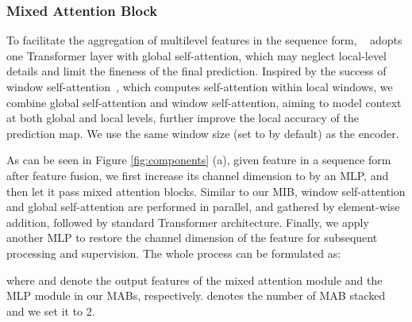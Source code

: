 \documentclass[lettersize,journal]{IEEEtran}
\begin{document}
\subsubsection{Mixed Attention Block}

To facilitate the aggregation of multilevel features in the sequence form, ~\cite{VST} adopts one Transformer layer with global self-attention, which may neglect local-level details and limit the fineness of the final prediction. Inspired by the success of window self-attention~\cite{Swin}, which computes self-attention within local windows, we combine global self-attention and window self-attention, aiming to model context at both global and local levels, further improve the local accuracy of the prediction map. We use the same window size (set to  by default) as the encoder. 

As can be seen in Figure \ref{fig:components} (a), given feature in a sequence form  after feature fusion, we first increase its channel dimension to  by an MLP, and then let it pass  mixed attention blocks. Similar to our MIB, window self-attention and global self-attention are performed in parallel, and gathered by element-wise addition, followed by standard Transformer architecture. Finally, we apply another MLP to restore the channel dimension of the feature for subsequent processing and supervision. The whole process can be formulated as:

where  and  denote the output features of the mixed attention module and the MLP module in our MABs, respectively.  denotes the number of MAB stacked and we set it to 2. 
\end{document}
